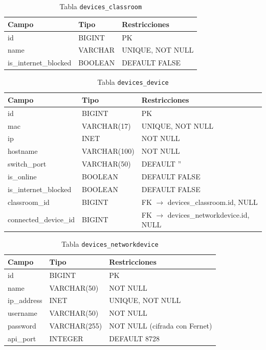 \documentclass[12pt, a4paper, twoside]{article}
\begin{document}
\begin{table}[H]
\centering
\caption{Tabla \texttt{devices\_classroom}}
\begin{tabularx}{\textwidth}{llX}
  \toprule
  \textbf{Campo} & \textbf{Tipo} & \textbf{Restricciones} \\
  \midrule
  id                   & BIGINT  & PK \\
  name                 & VARCHAR & UNIQUE, NOT NULL \\
  is\_internet\_blocked & BOOLEAN & DEFAULT FALSE \\
  \bottomrule
\end{tabularx}
\end{table}

\begin{table}[H]
\centering
\caption{Tabla \texttt{devices\_device}}
\begin{tabularx}{\textwidth}{llX}
  \toprule
  \textbf{Campo} & \textbf{Tipo} & \textbf{Restricciones} \\
  \midrule
  id                   & BIGINT       & PK \\
  mac                  & VARCHAR(17)  & UNIQUE, NOT NULL \\
  ip                   & INET         & NOT NULL \\
  hostname             & VARCHAR(100) & NOT NULL \\
  switch\_port         & VARCHAR(50)  & DEFAULT '' \\
  is\_online           & BOOLEAN      & DEFAULT FALSE \\
  is\_internet\_blocked & BOOLEAN     & DEFAULT FALSE \\
  classroom\_id        & BIGINT       & FK $\rightarrow$ devices\_classroom.id, NULL \\
  connected\_device\_id & BIGINT      & FK $\rightarrow$ devices\_networkdevice.id, NULL \\
  \bottomrule
\end{tabularx}
\end{table}

\begin{table}[H]
\centering
\caption{Tabla \texttt{devices\_networkdevice}}
\begin{tabularx}{\textwidth}{llX}
  \toprule
  \textbf{Campo} & \textbf{Tipo} & \textbf{Restricciones} \\
  \midrule
  id          & BIGINT       & PK \\
  name        & VARCHAR(50)  & NOT NULL \\
  ip\_address & INET         & UNIQUE, NOT NULL \\
  username    & VARCHAR(50)  & NOT NULL \\
  password    & VARCHAR(255) & NOT NULL (cifrada con Fernet) \\
  api\_port   & INTEGER      & DEFAULT 8728 \\
  \bottomrule
\end{tabularx}
\end{table}
\end{document}
